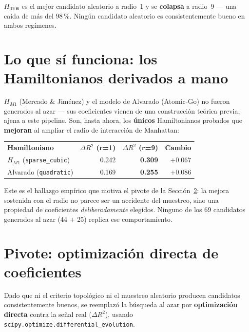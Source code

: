 \documentclass[11pt, a4paper]{article}
\newcommand{\TH}[1]{\cellcolor{cTHbg}\color{white}\textbf{#1}}
\newcommand{\good}[1]{\color{cGood}\textbf{#1}}
\begin{document}
$H_{0106}$ es el mejor candidato aleatorio a radio~1 y se
\textbf{colapsa} a radio~9 --- una ca\'ida de m\'as del 98\,\%. Ning\'un
candidato aleatorio es consistentemente bueno en ambos reg\'imenes.

\section{Lo que s\'i funciona: los Hamiltonianos derivados a mano}

$H_{M1}$ (Mercado \& Jim\'enez) y el modelo de Alvarado (Atomic-Go) no
fueron generados al azar --- sus coeficientes vienen de una construcci\'on
te\'orica previa, ajena a este pipeline. Son, hasta ahora, los
\textbf{\'unicos} Hamiltonianos probados que \textbf{mejoran} al ampliar
el radio de interacci\'on de Manhattan:

\medskip
\begin{center}
\begin{tabular}{lrrr}
  \TH{Hamiltoniano} & \TH{$\Delta R^2$ (r=1)} & \TH{$\Delta R^2$ (r=9)} & \TH{Cambio} \\[1pt]
  $H_{M1}$ (\texttt{sparse\_cubic}) & 0.242 & \good{0.309} & \good{$+0.067$} \\
  Alvarado (\texttt{quadratic})     & 0.169 & \good{0.255} & \good{$+0.086$} \\
\end{tabular}
\end{center}
\medskip

\begin{tcolorbox}[quotebox]
  Este es el hallazgo emp\'irico que motiva el pivote de la
  Secci\'on~\ref{sec:optimizacion}: la mejora sostenida con el radio no
  parece ser un accidente del muestreo, sino una propiedad de
  coeficientes \emph{deliberadamente} elegidos. Ninguno de los 69
  candidatos generados al azar (44 + 25) replica ese comportamiento.
\end{tcolorbox}

\section{Pivote: optimizaci\'on directa de coeficientes}
\label{sec:optimizacion}

Dado que ni el criterio topol\'ogico ni el muestreo aleatorio producen
candidatos consistentemente buenos, se reemplaz\'o la b\'usqueda al
azar por \textbf{optimizaci\'on directa} contra la se\~nal real
($\Delta R^2$), usando \texttt{scipy.optimize.differential\_evolution}.
\end{document}
